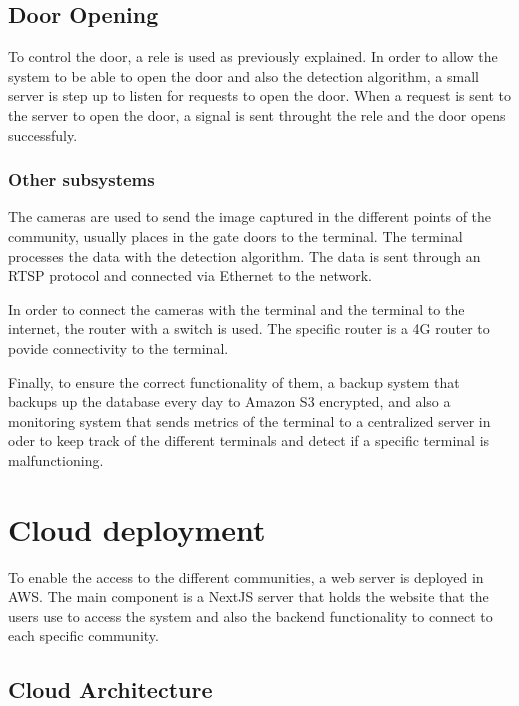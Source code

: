 
\subsection{Door Opening}

To control the door, a rele is used as previously explained. In order to allow the system to be able to open the door and also the detection algorithm, a small server is step up to listen for requests to open the door. When a request is sent to the server to open the door, a signal is sent throught the rele and the door opens successfuly.

\subsubsection{Other subsystems}

The cameras are used to send the image captured in the different points of the community, usually places in the gate doors to the terminal. The terminal processes the data with the detection algorithm. The data is sent through an RTSP  protocol and connected via Ethernet to the network.

In order to connect the cameras with the terminal and the terminal to the internet, the router with a switch is used. The specific router is a 4G router to povide connectivity to the terminal.

Finally, to ensure the correct functionality of them, a backup system that backups up the database every day to Amazon S3  encrypted, and also a monitoring system that sends metrics of the terminal to a centralized server in oder to keep track of the different terminals and detect if a specific terminal is malfunctioning.

\section{Cloud deployment}

To enable the access to the different communities, a web server is deployed in AWS. The main component is a NextJS server that holds the website that the users use to access the system and also the backend functionality to connect to each specific community.

\subsection{Cloud Architecture}

